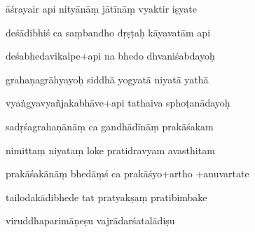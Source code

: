 \documentclass[article,12pt,a4paper]{memoir}%
\newcounter{parCount}
\begin{document}
	  
	  \pstart \leavevmode%
	āśrayair api nityānāṃ jātīnāṃ vyaktir iṣyate 
	{}
	\pend%
      

	  
	  \pstart {} deśādibhiś ca saṃbandho dṛṣṭaḥ kāyavatām api 
	{}
	\pend%
      

	  
	  \pstart \leavevmode%
	deśabhedavikalpe+api na bhedo dhvaniśabdayoḥ 
	{}
	\pend%
      

	  
	  \pstart {} grahaṇagrāhyayoḥ siddhā yogyatā niyatā yathā 
	{}
	\pend%
      

	  
	  \pstart \leavevmode%
	vyaṅgyavyañjakabhāve+api tathaiva sphoṭanādayoḥ 
	{}
	\pend%
      

	  
	  \pstart {} sadṛśagrahaṇānāṃ ca gandhādīnāṃ prakāśakam 
	{}
	\pend%
      

	  
	  \pstart \leavevmode%
	nimittaṃ niyataṃ loke pratidravyam avasthitam 
	{}
	\pend%
      

	  
	  \pstart {} prakāśakānāṃ bhedāṃś ca prakāśyo+artho +anuvartate 
	{}
	\pend%
      

	  
	  \pstart \leavevmode%
	tailodakādibhede tat pratyakṣaṃ pratibimbake 
	{}
	\pend%
      

	  
	  \pstart {} viruddhaparimāṇeṣu vajrādarśatalādiṣu 
	{}
	\pend%
      
\end{document}
